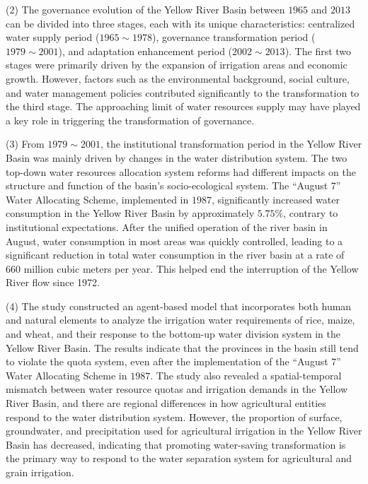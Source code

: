 \begin{eabstract}
  (2) The governance evolution of the Yellow River Basin between $1965$ and $2013$ can be divided into three stages, each with its unique characteristics: centralized water supply period ($1965 \sim 1978$), governance transformation period ($1979 \sim 2001$), and adaptation enhancement period ($2002 \sim 2013$). The first two stages were primarily driven by the expansion of irrigation areas and economic growth. However, factors such as the environmental background, social culture, and water management policies contributed significantly to the transformation to the third stage. The approaching limit of water resources supply may have played a key role in triggering the transformation of governance.

  (3) From $1979 \sim 2001$, the institutional transformation period in the Yellow River Basin was mainly driven by changes in the water distribution system. The two top-down water resources allocation system reforms had different impacts on the structure and function of the basin's socio-ecological system. The ``August 7'' Water Allocating Scheme, implemented in $1987$, significantly increased water consumption in the Yellow River Basin by approximately $5.75\%$, contrary to institutional expectations. After the unified operation of the river basin in August, water consumption in most areas was quickly controlled, leading to a significant reduction in total water consumption in the river basin at a rate of $660$ million cubic meters per year. This helped end the interruption of the Yellow River flow since 1972.

  (4) The study constructed an agent-based model that incorporates both human and natural elements to analyze the irrigation water requirements of rice, maize, and wheat, and their response to the bottom-up water division system in the Yellow River Basin. The results indicate that the provinces in the basin still tend to violate the quota system, even after the implementation of the ``August 7'' Water Allocating Scheme in $1987$. 
  The study also revealed a spatial-temporal mismatch between water resource quotas and irrigation demands in the Yellow River Basin, and there are regional differences in how agricultural entities respond to the water distribution system. However, the proportion of surface, groundwater, and precipitation used for agricultural irrigation in the Yellow River Basin has decreased, indicating that promoting water-saving transformation is the primary way to respond to the water separation system for agricultural and grain irrigation.


\end{eabstract}
